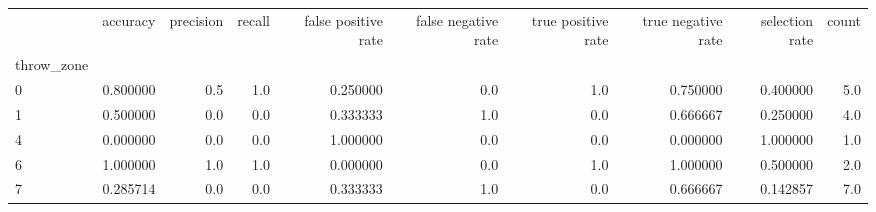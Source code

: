 \begin{tabular}{lrrrrrrrrr}
\toprule
{} &  accuracy &  precision &  recall &  false positive rate &  false negative rate &  true positive rate &  true negative rate &  selection rate &  count \\
throw\_zone &           &            &         &                      &                      &                     &                     &                 &        \\
\midrule
0          &  0.800000 &        0.5 &     1.0 &             0.250000 &                  0.0 &                 1.0 &            0.750000 &        0.400000 &    5.0 \\
1          &  0.500000 &        0.0 &     0.0 &             0.333333 &                  1.0 &                 0.0 &            0.666667 &        0.250000 &    4.0 \\
4          &  0.000000 &        0.0 &     0.0 &             1.000000 &                  0.0 &                 0.0 &            0.000000 &        1.000000 &    1.0 \\
6          &  1.000000 &        1.0 &     1.0 &             0.000000 &                  0.0 &                 1.0 &            1.000000 &        0.500000 &    2.0 \\
7          &  0.285714 &        0.0 &     0.0 &             0.333333 &                  1.0 &                 0.0 &            0.666667 &        0.142857 &    7.0 \\
\bottomrule
\end{tabular}
